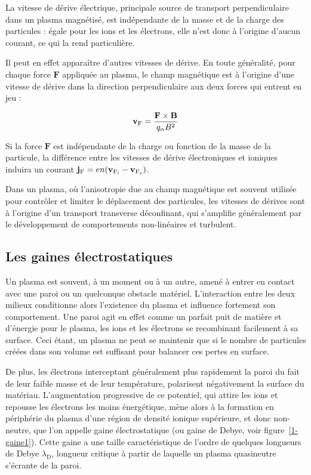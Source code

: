 \begin{refsection}
La vitesse de dérive électrique, principale source de transport perpendiculaire
dans un plasma magnétisé, est indépendante de la masse et de la charge des
particules : égale pour les ions et les électrons, elle n'est donc à
l'origine d'aucun courant, ce qui la rend particulière. 

Il peut en effet apparaître d'autres vitesses de dérive. En toute généralité, 
pour chaque force $\mathbf F$ appliquée au plasma, le champ magnétique est à
l'origine d'une vitesse de dérive dans la direction perpendiculaire aux deux
forces qui entrent en jeu :

\begin{equation}
\mathbf{v}{_{\text{F}}}=\frac{\mathbf{F}\times\mathbf{B}}{q_\alpha B^2}
\end{equation}

Si la force $\mathbf F$ est indépendante de la charge ou
fonction de la masse de la particule, la différence entre les vitesses de dérive
électroniques et ioniques induira un courant $\mathbf
j{_{\text{F}}}=en(\mathbf v{_{\text{F}_\text{i}}}-\mathbf
v{_{\text{F}_\text{e}}})$. 

Dans un plasma, où l'anisotropie due au champ
magnétique est souvent utilisée pour contrôler et limiter le déplacement des
particules, les vitesses de dérives sont à l'origine d'un transport
 transverse déconfinant, qui s'amplifie généralement par le développement de
 comportements non-linéaires et turbulent.
 
\subsection{Les gaines électrostatiques}
\label{1-gaines}
Un plasma est souvent, à un moment ou à un autre, amené à entrer en contact avec
une paroi ou un quelconque obstacle matériel. L'interaction entre
les deux milieux conditionne alors l'existence du plasma et influence
fortement son comportement. Une paroi agit en effet comme un parfait
puit de matière et d'énergie pour le plasma, les ions et les électrons se
recombinant facilement à sa surface. Ceci étant, un plasma ne peut se maintenir
que si le nombre de particules créées dans son volume est suffisant pour
balancer ces pertes en surface. 

De plus, les électrons interceptant généralement
plus rapidement la paroi du fait de leur faible masse et de leur température,
polarisent négativement la surface du matériau.
L'augmentation progressive de ce potentiel, qui attire les ions et repousse les
électrons les moins énergétique, mène alors à la formation en périphérie du
plasma d'une région de densité ionique supérieure, et donc non-neutre, que l'on
appelle gaine électrostatique (ou gaine de Debye, voir figure~\ref{1-gaine1}).
Cette gaine a une taille caractéristique de l'ordre de quelques longueurs de
Debye $\lambda_\text{D}$, longueur critique à partir de laquelle un plasma
quasineutre  s'écrante de la paroi.


\end{refsection}
